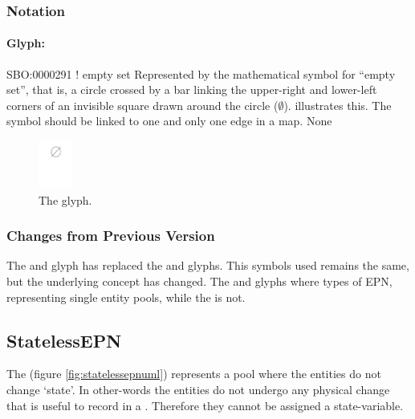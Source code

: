 \subsubsection{Notation}

\paragraph{Glyph: }

\begin{glyphDescription}
\glyphSboTerm SBO:0000291 ! empty set
\glyphContainer Represented by the mathematical symbol for ``empty
set'', that is, a circle crossed by a bar linking the upper-right and
lower-left corners of an invisible square drawn around the circle ($\emptyset$).
 illustrates this.  The symbol should be linked to one
and only one edge in a map.
\glyphLabel None
\end{glyphDescription}

\begin{figure}[H]
  \centering
  \includegraphics[width = 0.1\textwidth]{images/sourceSink}
  \caption{The  glyph.}
  \label{fig:sourceSink}
\end{figure}

\subsubsection{Changes from Previous Version}

The  and  glyph has replaced the
 and  glyphs. This symbols used remains the
same, but the underlying concept has changed. The  and
 glyphs where types of EPN, representing single entity
pools, while the  is not.

\subsection{StatelessEPN}
\label{defn:StatelessEPN}

The  (figure \ref{fig:statelessepnuml})
represents a pool where the entities do not change `state'. In
other-words the entities do not undergo any physical change that is
useful to record in a \PDm. Therefore they cannot be assigned
a state-variable.


